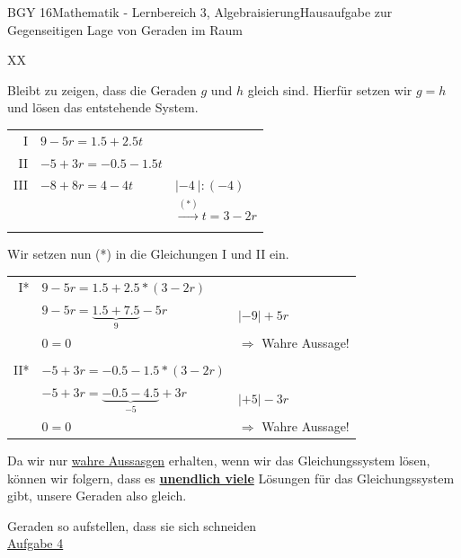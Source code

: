 \documentclass[oneside,openany,headings=optiontotoc,11pt,numbers=noenddot]{scrreprt}
\begin{document}
\begin{worksheet}{BGY 16}{Mathematik - Lernbereich 3, Algebraisierung}{Hausaufgabe zur Gegenseitigen Lage von Geraden im Raum}
\begin{framed}
\begin{tabularx}{\textwidth}{XX}
			\end{tabularx}
			Bleibt zu zeigen, dass die Geraden \(g\) und \(h\) gleich sind. Hierfür setzen wir \(g=h\) und lösen das entstehende System.\\
			\begin{tabularx}{\textwidth}{rXl}
				I & \(9 -5r = 1.5+2.5t\) & \(\)\\
				II & \(-5+3r = -0.5-1.5t\) & \\
				III & \(-8+8r = 4 -4t\) & \(|-4\ | :(-4)\)\\
				& & \(\xrightarrow{(*)} t = 3-2r\)\\
				\hline\\
			\end{tabularx}
			Wir setzen nun (*) in die Gleichungen I und II ein.\\
			\begin{tabularx}{\textwidth}{rXl}
				I* & \(9 -5r = 1.5+2.5*(3-2r)\)\\
				& \(9-5r = \underbrace{1.5+7.5}_{9} -5r\) & \(|-9 |+5r\)\\
				& \(0 = 0\) & \(\Rightarrow\) Wahre Aussage!\\
				\hline\\
				II* & \(-5+3r = -0.5-1.5*(3-2r)\) & \\
				& \(-5+3r = \underbrace{-0.5-4.5}_{-5} +3r\) & \(| +5 | -3r\)\\
				& \(0 = 0\) & \(\Rightarrow\) Wahre Aussage!
			\end{tabularx}
			Da wir nur \underline{wahre Aussasgen} erhalten, wenn wir das Gleichungssystem lösen, können wir folgern, dass es \underline{\textbf{unendlich viele}} Lösungen für das Gleichungssystem gibt, unsere Geraden also \color{codegreen}gleich\normalcolor.
		\end{framed}
		\begin{framed}
			\noindent
			\tiny{\color{codegray}Geraden so aufstellen, dass sie sich schneiden}\\
			\normalsize\normalcolor
			\noindent
			\underline{Aufgabe 4}\\

\end{framed}
\end{worksheet}
\end{document}

